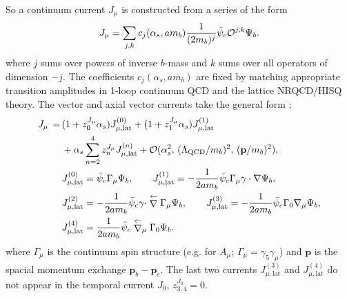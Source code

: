 So a continuum current $J_{\mu}$ is constructed from a series of the form
\begin{align}
  J_{\mu} = \sum_{j,k} c_j(\alpha_s,am_b) {1\over (2m_b)^j} \bar{\psi}_c \mathcal{O}^{j,k} \Psi_b.
\end{align}
where $j$ sums over powers of inverse $b$-mass and $k$ sums over all operators of dimension $-j$. The coefficients $c_j(\alpha_s,am_b)$ are fixed by matching appropriate transition amplitudes in 1-loop continuum QCD and the lattice NRQCD/HISQ theory. The vector and axial vector currents take the general form \cite{PhysRevD.59.094504};
\begin{align}
	J_{\mu} \,=\, & ( 1 + z^{J_{\mu}}_0 \alpha_s ) J_{\mu,\text{lat}}^{(0)} + ( 1 + z^{J_{\mu}}_1 \alpha_s ) J_{\mu,\text{lat}}^{(1)} \nonumber \\ &+ \alpha_s \sum_{n=2}^4 z^{J_{\mu}}_n J_{\mu,\text{lat}}^{(n)} + \mathcal{O}( \alpha_s^2,\, (\Lambda_{\text{QCD}}/m_b)^2,\, ({\textbf{p}}/m_b)^2 ),
	\label{eq:nrqcd-hisq-current}
        \\
        & J_{\mu,\text{lat}}^{(0)} = \bar{\psi}_c \Gamma_{\mu} \Psi_b,
        \quad\quad J_{\mu,\text{lat}}^{(1)} = -{1\over 2am_b} \bar{\psi}_c \Gamma_{\mu} \gamma\cdot \nabla \Psi_b,
        \nonumber
        \\
        & J_{\mu,\text{lat}}^{(2)} = -{1\over 2am_b} \bar{\psi}_c \gamma\cdot \stackrel{\leftarrow}{\nabla} \Gamma_{\mu} \Psi_b,
        \nonumber
        \quad\quad J_{\mu,\text{lat}}^{(3)} = -{1\over 2am_b}  \bar{\psi}_c \Gamma_0 \nabla_{\mu} \Psi_b,
        \nonumber
        \\
        & J_{\mu,\text{lat}}^{(4)} = {1\over 2am_b} \bar{\psi}_c \stackrel{\leftarrow}{\nabla}_{\mu} \Gamma_0 \Psi_b.
        \nonumber
\end{align}
where $\Gamma_{\mu}$ is the continuum spin structure (e.g. for $A_{\mu}$; $\Gamma_{\mu}=\gamma_5\gamma_{\mu}$) and ${\textbf{p}}$ is the spacial momentum exchange ${\textbf{p}}_b-{\textbf{p}}_c$. The last two currents $J^{(3)}_{\mu,\text{lat}}$ and $J^{(4)}_{\mu,\text{lat}}$ do not appear in the temporal current $J_0$, $z_{3,4}^{J_0} = 0$.

